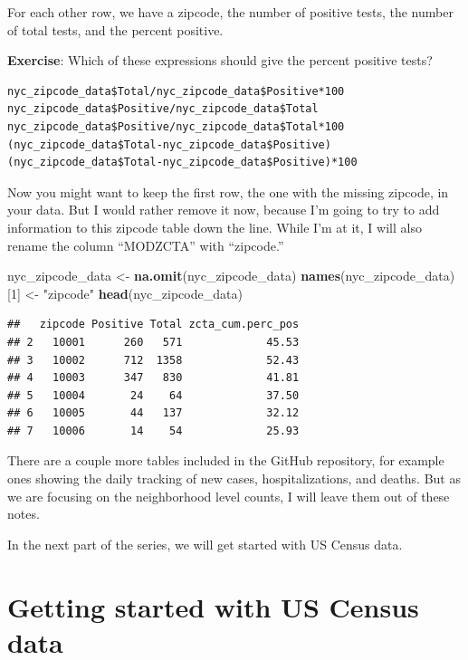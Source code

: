 \documentclass[openany]{book}
\newenvironment{Shaded}{\begin{snugshade}}{\end{snugshade}}
\newcommand{\DecValTok}[1]{\textcolor[rgb]{0.00,0.00,0.81}{#1}}
\newcommand{\KeywordTok}[1]{\textcolor[rgb]{0.13,0.29,0.53}{\textbf{#1}}}
\newcommand{\NormalTok}[1]{#1}
\newcommand{\StringTok}[1]{\textcolor[rgb]{0.31,0.60,0.02}{#1}}
\begin{document}
For each other row, we have a zipcode, the number of positive tests, the number of total tests, and the percent positive.

\textbf{Exercise}: Which of these expressions should give the percent positive tests?

\begin{verbatim}
nyc_zipcode_data$Total/nyc_zipcode_data$Positive*100
nyc_zipcode_data$Positive/nyc_zipcode_data$Total
nyc_zipcode_data$Positive/nyc_zipcode_data$Total*100
(nyc_zipcode_data$Total-nyc_zipcode_data$Positive)
(nyc_zipcode_data$Total-nyc_zipcode_data$Positive)*100
\end{verbatim}

Now you might want to keep the first row, the one with the missing zipcode, in your data. But I would rather remove it now, because I'm going to try to add information to this zipcode table down the line. While I'm at it, I will also rename the column ``MODZCTA'' with ``zipcode.''

\begin{Shaded}
\begin{Highlighting}[]
\NormalTok{nyc_zipcode_data <-}\StringTok{ }\KeywordTok{na.omit}\NormalTok{(nyc_zipcode_data)}
\KeywordTok{names}\NormalTok{(nyc_zipcode_data)[}\DecValTok{1}\NormalTok{] <-}\StringTok{ "zipcode"}
\KeywordTok{head}\NormalTok{(nyc_zipcode_data)}
\end{Highlighting}
\end{Shaded}

\begin{verbatim}
##   zipcode Positive Total zcta_cum.perc_pos
## 2   10001      260   571             45.53
## 3   10002      712  1358             52.43
## 4   10003      347   830             41.81
## 5   10004       24    64             37.50
## 6   10005       44   137             32.12
## 7   10006       14    54             25.93
\end{verbatim}

There are a couple more tables included in the GitHub repository, for example ones showing the daily tracking of new cases, hospitalizations, and deaths. But as we are focusing on the neighborhood level counts, I will leave them out of these notes.

In the next part of the series, we will get started with US Census data.

\hypertarget{part2}{%
\section{Getting started with US Census data}\label{part2}}
\end{document}
